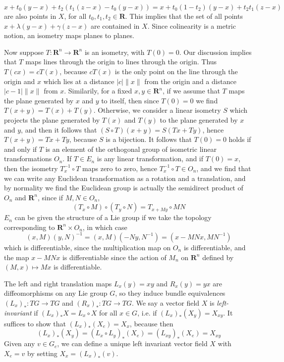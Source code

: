 %
\[ x + t_0 (y - x) + t_2 (t_1 (z - x) - t_0 (y - x)) = x + t_0 (1 - t_2) (y - x) + t_2 t_1 (z - x) \]
%
are also points in $X$, for all $t_0,t_1,t_2 \in \mathbf{R}$. This implies that the set of all points $x + \lambda (y - x) + \gamma (z - x)$ are contained in $X$. Since colinearity is a metric notion, an isometry maps planes to planes.

Now suppose $T: \mathbf{R}^n \to \mathbf{R}^n$ is an isometry, with $T(0) = 0$. Our discussion implies that $T$ maps lines through the origin to lines through the origin. Thus $T(cx) = cT(x)$, because $cT(x)$ is the only point on the line through the origin and $x$ which lies at a distance $|c|\|x\|$ from the origin and a distance $|c - 1|\|x\|$ from $x$. Similarily, for a fixed $x,y \in \mathbf{R}^n$, if we assume that $T$ maps the plane generated by $x$ and $y$ to itself, then since $T(0) = 0$ we find $T(x + y) = T(x) + T(y)$. Otherwise, we consider a linear isometry $S$ which projects the plane generated by $T(x)$ and $T(y)$ to the plane generated by $x$ and $y$, and then it follows that $(S \circ T)(x + y) = S(Tx + Ty)$, hence $T(x + y) = Tx + Ty$, because $S$ is a bijection. It follows that $T(0) = 0$ holds if and only if $T$ is an element of the orthogonal group of isometric linear transformations $O_n$. If $T \in E_n$ is any linear transformation, and if $T(0) = x$, then the isometry $T_x^{-1} \circ T$ maps zero to zero, hence $T_x^{-1} \circ T \in O_n$, and we find that we can write any Euclidean transformation as a rotation and a translation, and by normality we find the Euclidean group is actually the semidirect product of $O_n$ and $\mathbf{R}^n$, since if $M,N \in O_n$,
%
\[ (T_x \circ M) \circ (T_y \circ N) = T_{x + My} \circ MN \]
%
$E_n$ can be given the structure of a Lie group if we take the topology corresponding to $\mathbf{R}^n \times O_n$, in which case
%
\[ (x,M)(y,N)^{-1} = (x,M)(-Ny,N^{-1}) = (x - MNx,MN^{-1}) \]
%
which is differentiable, since the multiplication map on $O_n$ is differentiable, and the map $x - MNx$ is differentiable since the action of $M_n$ on $\mathbf{R}^n$ defined by $(M,x) \mapsto Mx$ is differentiable.

The left and right translation maps $L_x(y) = xy$ and $R_x(y) = yx$ are diffeomorphisms on any Lie group $G$, so they induce bundle equivalences $(L_x)_*: TG \to TG$ and $(R_x)_*: TG \to TG$. We say a vector field $X$ is \emph{left-invariant} if $(L_x)_* X = L_x \circ X$ for all $x \in G$, i.e. if $(L_x)_*(X_y) = X_{xy}$. It suffices to show that $(L_x)_*(X_e) = X_x$, because then
%
\[ (L_x)_*(X_y) = (L_x \circ L_y)_*(X_e) = (L_{xy})_*(X_e) = X_{xy} \]
%
Given any $v \in G_e$, we can define a unique left invariant vector field $X$ with $X_e = v$ by setting $X_x = (L_x)_*(v)$.

